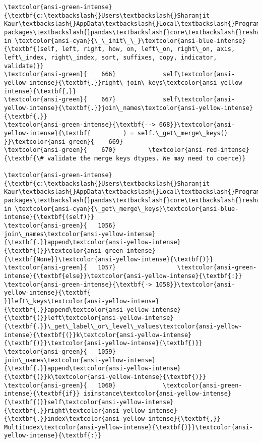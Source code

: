 \documentclass[11pt]{article}
\begin{document}
\begin{Verbatim}[commandchars=\\\{\}, frame=single, framerule=2mm, rulecolor=\color{outerrorbackground}]
\textcolor{ansi-green-intense}{\textbf{c:\textbackslash{}Users\textbackslash{}Sharanjit Kaur\textbackslash{}AppData\textbackslash{}Local\textbackslash{}Programs\textbackslash{}Python\textbackslash{}Python39\textbackslash{}lib\textbackslash{}site-packages\textbackslash{}pandas\textbackslash{}core\textbackslash{}reshape\textbackslash{}merge.py}} in \textcolor{ansi-cyan}{\_\_init\_\_}\textcolor{ansi-blue-intense}{\textbf{(self, left, right, how, on, left\_on, right\_on, axis, left\_index, right\_index, sort, suffixes, copy, indicator, validate)}}
\textcolor{ansi-green}{    666}             self\textcolor{ansi-yellow-intense}{\textbf{.}}right\_join\_keys\textcolor{ansi-yellow-intense}{\textbf{,}}
\textcolor{ansi-green}{    667}             self\textcolor{ansi-yellow-intense}{\textbf{.}}join\_names\textcolor{ansi-yellow-intense}{\textbf{,}}
\textcolor{ansi-green-intense}{\textbf{--> 668}}\textcolor{ansi-yellow-intense}{\textbf{         ) = self.\_get\_merge\_keys()
}}\textcolor{ansi-green}{    669} 
\textcolor{ansi-green}{    670}         \textcolor{ansi-red-intense}{\textbf{\# validate the merge keys dtypes. We may need to coerce}}

\textcolor{ansi-green-intense}{\textbf{c:\textbackslash{}Users\textbackslash{}Sharanjit Kaur\textbackslash{}AppData\textbackslash{}Local\textbackslash{}Programs\textbackslash{}Python\textbackslash{}Python39\textbackslash{}lib\textbackslash{}site-packages\textbackslash{}pandas\textbackslash{}core\textbackslash{}reshape\textbackslash{}merge.py}} in \textcolor{ansi-cyan}{\_get\_merge\_keys}\textcolor{ansi-blue-intense}{\textbf{(self)}}
\textcolor{ansi-green}{   1056}                     join\_names\textcolor{ansi-yellow-intense}{\textbf{.}}append\textcolor{ansi-yellow-intense}{\textbf{(}}\textcolor{ansi-green-intense}{\textbf{None}}\textcolor{ansi-yellow-intense}{\textbf{)}}
\textcolor{ansi-green}{   1057}                 \textcolor{ansi-green-intense}{\textbf{else}}\textcolor{ansi-yellow-intense}{\textbf{:}}
\textcolor{ansi-green-intense}{\textbf{-> 1058}}\textcolor{ansi-yellow-intense}{\textbf{                     }}left\_keys\textcolor{ansi-yellow-intense}{\textbf{.}}append\textcolor{ansi-yellow-intense}{\textbf{(}}left\textcolor{ansi-yellow-intense}{\textbf{.}}\_get\_label\_or\_level\_values\textcolor{ansi-yellow-intense}{\textbf{(}}k\textcolor{ansi-yellow-intense}{\textbf{)}}\textcolor{ansi-yellow-intense}{\textbf{)}}
\textcolor{ansi-green}{   1059}                     join\_names\textcolor{ansi-yellow-intense}{\textbf{.}}append\textcolor{ansi-yellow-intense}{\textbf{(}}k\textcolor{ansi-yellow-intense}{\textbf{)}}
\textcolor{ansi-green}{   1060}             \textcolor{ansi-green-intense}{\textbf{if}} isinstance\textcolor{ansi-yellow-intense}{\textbf{(}}self\textcolor{ansi-yellow-intense}{\textbf{.}}right\textcolor{ansi-yellow-intense}{\textbf{.}}index\textcolor{ansi-yellow-intense}{\textbf{,}} MultiIndex\textcolor{ansi-yellow-intense}{\textbf{)}}\textcolor{ansi-yellow-intense}{\textbf{:}}


\end{Verbatim}
\end{document}
